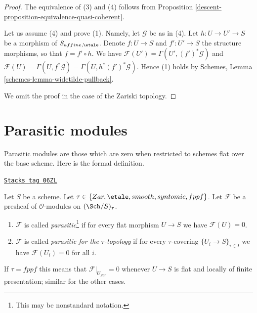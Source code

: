 \begin{proof}
\medskip\noindent
The equivalence of (3) and (4) follows from
Proposition \ref{descent-proposition-equivalence-quasi-coherent}.

\medskip\noindent
Let us assume (4) and prove (1). Namely, let
$\mathcal{G}$ be as in (4). Let $h : U \to U' \to S$ be a morphism
of $S_{affine, \etale}$. Denote $f : U \to S$ and $f' : U' \to S$ the
structure morphisms, so that $f = f' \circ h$.
We have $\mathcal{F}(U') = \Gamma(U', (f')^*\mathcal{G})$ and
$\mathcal{F}(U) = \Gamma(U, f^*\mathcal{G}) = \Gamma(U, h^*(f')^*\mathcal{G})$.
Hence (1) holds by Schemes, Lemma \ref{schemes-lemma-widetilde-pullback}.

\medskip\noindent
We omit the proof in the case of the Zariski topology.
\end{proof}

\section{Parasitic modules}
\label{descent-section-parasitic}
Parasitic modules are those which are zero when restricted
to schemes flat over the base scheme. Here is the formal definition.

\begin{definition}[Parasitic]
\label{descent-definition-parasitic}
\href{https://stacks.math.columbia.edu/tag/06ZL}{\texttt{Stacks tag 06ZL}}

Let $S$ be a scheme. Let $\tau \in \{Zar, \etale,
smooth, syntomic, fppf\}$. Let $\mathcal{F}$ be a presheaf
of $\mathcal{O}$-modules on $(\Sch/S)_\tau$.
\begin{enumerate}
\item $\mathcal{F}$ is called
{\it parasitic}\footnote{This may be nonstandard notation.}
if for every flat morphism $U \to S$ we have $\mathcal{F}(U) = 0$.
\item $\mathcal{F}$ is called {\it parasitic for the $\tau$-topology}
if for every $\tau$-covering $\{U_i \to S\}_{i \in I}$ we have
$\mathcal{F}(U_i) = 0$ for all $i$.
\end{enumerate}
\end{definition}

If $\tau = fppf$ this means that $\mathcal{F}|_{U_{Zar}} = 0$ whenever
$U \to S$ is flat and locally of finite presentation; similar for
the other cases.

